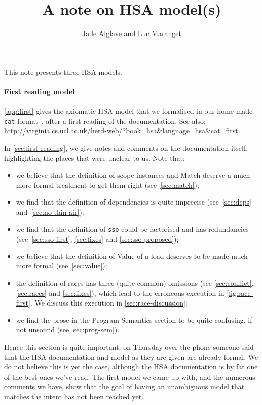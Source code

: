 \documentclass[a4paper]{article}
\begin{document}
\title{A note on HSA model(s)}
\author{Jade Alglave and Luc Maranget}
\maketitle
\let\prog\textsf

This note presents three HSA models. 
 
\paragraph{First reading model} \myapp\ref{app:first} gives the axiomatic HSA
model that we formalised in our home made {\tt cat} format~\cite{amt14}, after
a first reading of the documentation. See also:
\url{http://virginia.cs.ucl.ac.uk/herd-web/?book=hsa&language=hsa&cat=first}.

In \mysec\ref{sec:first-reading}, we give notes and comments on the
documentation itself, highlighting the places that were unclear to us. Note
that:
\begin{itemize}
\item we believe that the definition of scope instances and Match deserve a
much more formal treatment to get them right (see~\mysec\ref{sec:match});
\item we find that the definition of dependencies is quite imprecise (see~\mysec\ref{sec:deps} and~\ref{sec:no-thin-air});
\item we find that the definition of {\tt sso} could be factorised and has
redundancies (see~\mysec\ref{sec:sso-first}, \ref{sec:fixes} and \ref{sec:sso-proposed});
\item we believe that the definition of Value of a load deserves to be made
much more formal (see~\mysec\ref{sec:value});
\item the definition of races has three (quite common) omissions (see
\mysec\ref{sec:conflict}, \ref{sec:races} and \ref{sec:fixes}), which lead to
the erroneous execution in \myfig\ref{fig:race-first}. {\color{blue} We discuss
this execution in \mysec\ref{sec:race-discussion}};
\item we find the prose in the Program Semantics section to be quite
confusing, if not unsound (see \mysec\ref{sec:prog-sem}).  \end{itemize}

Hence this section is quite important: on Thursday over the phone someone said
that the HSA documentation and model as they are given are already formal. We do
not believe this is yet the case, although the HSA documentation is by far one
of the best ones we've read. The first model we came up with, and the numerous
comments we have, show that the goal of having an unambiguous model that matches
the intent has not been reached yet.
\end{document}
